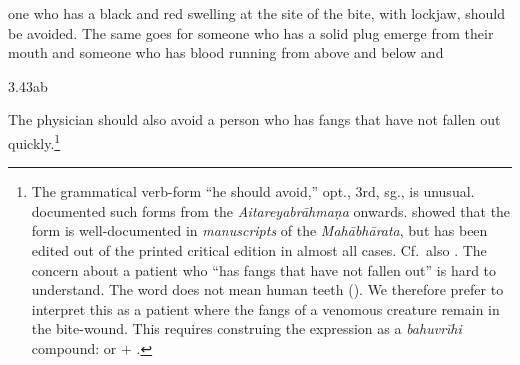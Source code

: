 \begin{translation}[resume]
one who has a black and red swelling at the site of the bite, with
lockjaw, should be avoided.  The same goes for someone who has a solid
plug emerge from their mouth  and someone who has blood running from
above and below and
 
 \item[3.43ab]  
 
The physician should also avoid a person who has fangs that have not
fallen out quickly.\footnote{The grammatical verb-form
     “he  should avoid,” opt., 3rd, sg., is unusual.
    \citet[10\,ff]{reno-1940}  documented such forms from the
    \emph{Aitareyabrāhmaṇa} onwards.  \citet[\P  6.3.3 “Peculiar optative
    endings”, pp.\,176--177]{ober-2003} showed that the form is
    well-documented in \emph{manuscripts} of the \emph{Mahābhārata}, but
    has been edited out of the printed critical edition in almost all
    cases. Cf.\ also \cite{kuli-2006}.  The concern about a patient who
    “has fangs that have not fallen out” is hard  to understand.  The word
     does not mean human teeth  ().  We therefore
    prefer to interpret this as a patient where the  fangs of a venomous
    creature remain in the bite-wound.  This requires  construing the
    expression as a \emph{bahuvrīhi} compound:  or
     $+$  .}
\end{translation}

